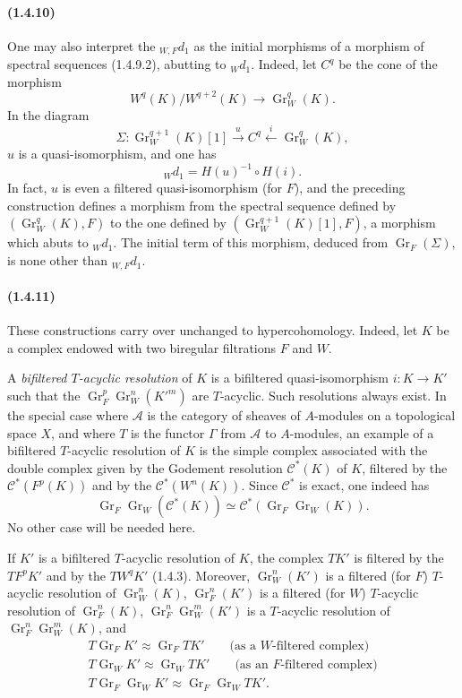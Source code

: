 \documentclass[10pt]{article}
\newcommand{\Gr}{\operatorname{Gr}}
\newcommand{\calA}{\mathcal A}
\begin{document}
\paragraph{(1.4.10)} One may also interpret the ${}_{W,F}d_1$ as the initial morphisms of a morphism of spectral sequences (1.4.9.2), abutting to ${}_Wd_1$. Indeed, let $C^q$ be the cone of the morphism
\[
W^q(K)/W^{q+2}(K)\longrightarrow\Gr_W^q(K).
\]
In the diagram
\[
\Sigma:\Gr_W^{q+1}(K)[1]\xrightarrow{u} C^q\xleftarrow{i}\Gr_W^q(K),
\]
$u$ is a quasi-isomorphism, and one has
\[
{}_Wd_1=H(u)^{-1}\circ H(i).
\]
In fact, $u$ is even a filtered quasi-isomorphism (for $F$), and the preceding construction defines a morphism from the spectral sequence defined by $(\Gr_W^q(K),F)$ to the one defined by $(\Gr_W^{q+1}(K)[1],F)$, a morphism which abuts to ${}_Wd_1$. The initial term of this morphism, deduced from $\Gr_F(\Sigma)$, is none other than ${}_{W,F}d_1$.

\paragraph{(1.4.11)} These constructions carry over unchanged to hypercohomology. Indeed, let $K$ be a complex endowed with two biregular filtrations $F$ and $W$.

A \emph{bifiltered $T$-acyclic resolution} of $K$ is a bifiltered quasi-isomorphism $i:K\to K'$ such that the $\Gr_F^p\Gr_W^n(K'^m)$ are $T$-acyclic. Such resolutions always exist. In the special case where $\calA$ is the category of sheaves of $A$-modules on a topological space $X$, and where $T$ is the functor $\Gamma$ from $\calA$ to $A$-modules, an example of a bifiltered $T$-acyclic resolution of $K$ is the simple complex associated with the double complex given by the Godement resolution $\mathcal C^*(K)$ of $K$, filtered by the $\mathcal C^*(F^p(K))$ and by the $\mathcal C^*(W^n(K))$. Since $\mathcal C^*$ is exact, one indeed has
\[
\Gr_F\Gr_W(\mathcal C^*(K))\simeq \mathcal C^*(\Gr_F\Gr_W(K)).
\]
No other case will be needed here.

If $K'$ is a bifiltered $T$-acyclic resolution of $K$, the complex $TK'$ is filtered by the $TF^pK'$ and by the $TW^qK'$ (1.4.3). Moreover, $\Gr_W^n(K')$ is a filtered (for $F$) $T$-acyclic resolution of $\Gr_W^n(K)$, $\Gr_F^n(K')$ is a filtered (for $W$) $T$-acyclic resolution of $\Gr_F^n(K)$, $\Gr_F^n\Gr_W^m(K')$ is a $T$-acyclic resolution of $\Gr_F^n\Gr_W^m(K)$, and
\[
\begin{gathered}
T\Gr_FK'\approx\Gr_FTK'\qquad\text{(as a $W$-filtered complex)}\\
T\Gr_WK'\approx\Gr_WTK'\qquad\text{(as an $F$-filtered complex)}\\
T\Gr_F\Gr_WK'\approx\Gr_F\Gr_WTK'.
\end{gathered}
\]
\end{document}
